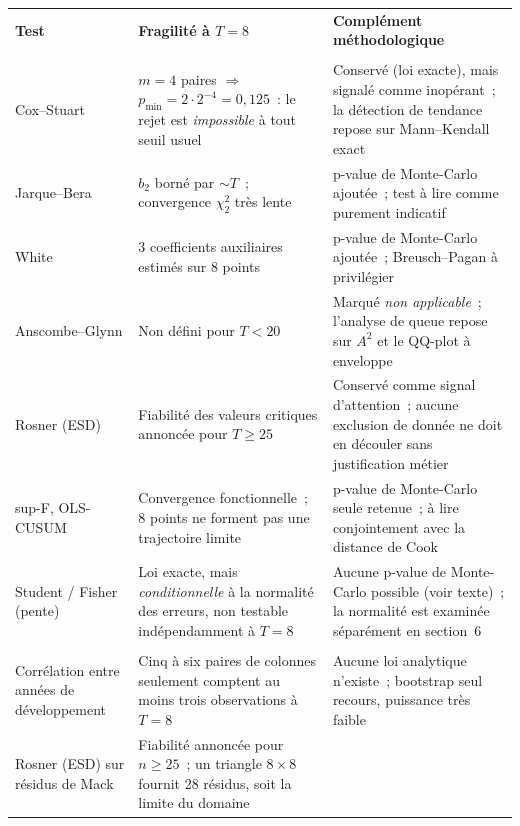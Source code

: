\documentclass[a4paper,11pt]{article}
\begin{document}
\begin{center}
\small
{}
\begin{tabular}{@{}p{3.4cm}p{5.4cm}p{5.9cm}@{}}
\rowcolor{tableheader}
\textcolor{financeblue}{\textbf{Test}} &
\textcolor{financeblue}{\textbf{Fragilité à $T = 8$}} &
\textcolor{financeblue}{\textbf{Complément méthodologique}} \\
\rowcolor{tableheader}
\multicolumn{3}{@{}l@{}}{\textcolor{financeblue}{\textbf{Méthode lognormale}}} \\
Cox--Stuart & $m = 4$ paires $\Rightarrow$
$p_{\min} = 2\cdot 2^{-4} = 0{,}125$~: le rejet est \emph{impossible} à tout
seuil usuel & Conservé (loi exacte), mais signalé comme inopérant~; la détection
de tendance repose sur Mann--Kendall exact \\
Jarque--Bera & $b_2$ borné par $\sim T$~; convergence $\chi^2_2$ très lente &
p-value de Monte-Carlo ajoutée~; test à lire comme purement indicatif \\
White & 3 coefficients auxiliaires estimés sur 8 points & p-value de
Monte-Carlo ajoutée~; Breusch--Pagan à privilégier \\
Anscombe--Glynn & Non défini pour $T < 20$ & Marqué \emph{non applicable}~;
l'analyse de queue repose sur $A^2$ et le QQ-plot à enveloppe \\
Rosner (ESD) & Fiabilité des valeurs critiques annoncée pour $T \ge 25$ &
Conservé comme signal d'attention~; aucune exclusion de donnée ne doit en
découler sans justification métier \\
sup-F, OLS-CUSUM & Convergence fonctionnelle~; 8 points ne forment pas une
trajectoire limite & p-value de Monte-Carlo seule retenue~; à lire
conjointement avec la distance de Cook \\
Student / Fisher (pente) & Loi exacte, mais \emph{conditionnelle} à la
normalité des erreurs, non testable indépendamment à $T = 8$ &
Aucune p-value de Monte-Carlo possible (voir texte)~; la normalité est
examinée séparément en section~6 \\
\rowcolor{tableheader}
\multicolumn{3}{@{}l@{}}{\textcolor{financeblue}{\textbf{Méthode Merz--Wüthrich}}} \\
Corrélation entre années de développement & Cinq à six paires de colonnes
seulement comptent au moins trois observations à $T = 8$ &
Aucune loi analytique n'existe~; bootstrap seul recours, puissance très faible \\
Rosner (ESD) sur résidus de Mack & Fiabilité annoncée pour $n \ge 25$~; un
triangle $8\times8$ fournit 28 résidus, soit la limite du domaine &

\end{tabular}
\end{center}
\end{document}

